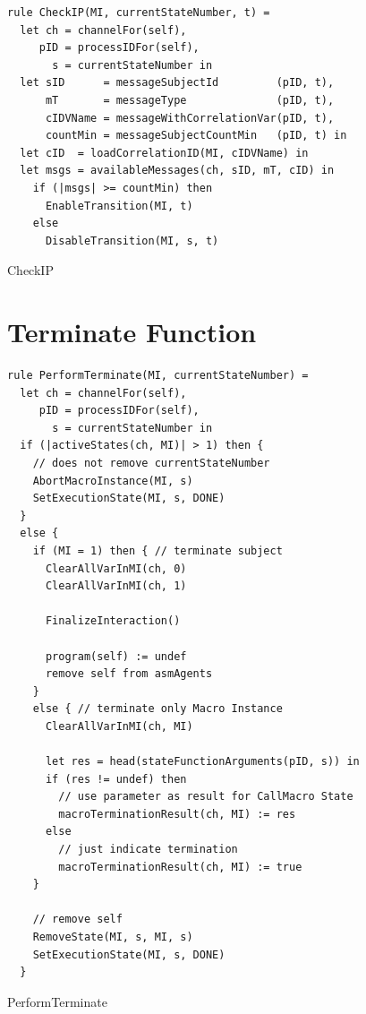 \begin{listing}[H]
\begin{verbatim}
rule CheckIP(MI, currentStateNumber, t) =
  let ch = channelFor(self),
     pID = processIDFor(self),
       s = currentStateNumber in
  let sID      = messageSubjectId         (pID, t),
      mT       = messageType              (pID, t),
      cIDVName = messageWithCorrelationVar(pID, t),
      countMin = messageSubjectCountMin   (pID, t) in
  let cID  = loadCorrelationID(MI, cIDVName) in
  let msgs = availableMessages(ch, sID, mT, cID) in
    if (|msgs| >= countMin) then
      EnableTransition(MI, t)
    else
      DisableTransition(MI, s, t)
\end{verbatim}
\caption{CheckIP}
\label{lst:asm:CheckIP}
\end{listing}





\section{Terminate Function}

\begin{listing}[H]
\begin{verbatim}
rule PerformTerminate(MI, currentStateNumber) =
  let ch = channelFor(self),
     pID = processIDFor(self),
       s = currentStateNumber in
  if (|activeStates(ch, MI)| > 1) then {
    // does not remove currentStateNumber
    AbortMacroInstance(MI, s)
    SetExecutionState(MI, s, DONE)
  }
  else {
    if (MI = 1) then { // terminate subject
      ClearAllVarInMI(ch, 0)
      ClearAllVarInMI(ch, 1)

      FinalizeInteraction()

      program(self) := undef
      remove self from asmAgents
    }
    else { // terminate only Macro Instance
      ClearAllVarInMI(ch, MI)

      let res = head(stateFunctionArguments(pID, s)) in
      if (res != undef) then
        // use parameter as result for CallMacro State
        macroTerminationResult(ch, MI) := res
      else
        // just indicate termination
        macroTerminationResult(ch, MI) := true
    }

    // remove self
    RemoveState(MI, s, MI, s)
    SetExecutionState(MI, s, DONE)
  }
\end{verbatim}
\caption{PerformTerminate}
\label{lst:asm:PerformTerminate}
\end{listing}



